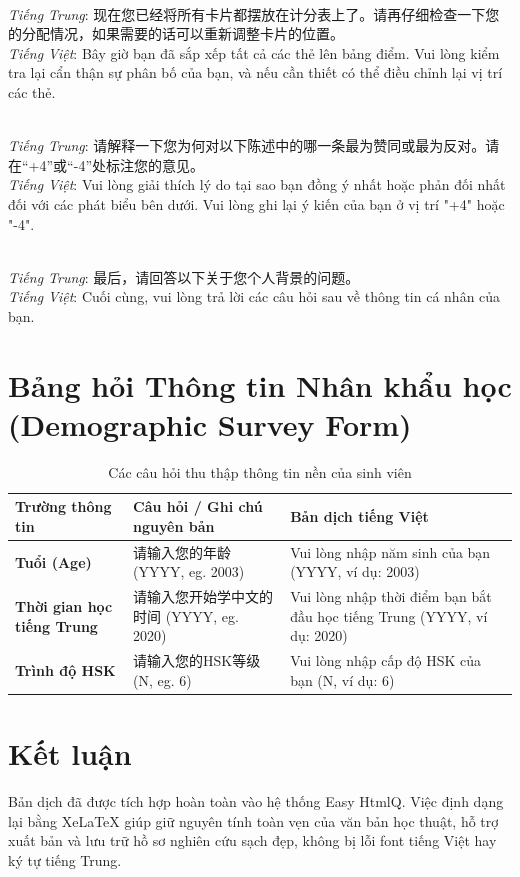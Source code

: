 \documentclass[11pt,a4paper]{article}
\begin{document}
\begin{description}[style=unboxed,leftmargin=0cm]
    \item[Bước 3 / 5 (Step 3 of 5: Review Sorting)] \hfill \\
    \textit{Tiếng Trung}: 现在您已经将所有卡片都摆放在计分表上了。请再仔细检查一下您的分配情况，如果需要的话可以重新调整卡片的位置。\\
    \textit{Tiếng Việt}: Bây giờ bạn đã sắp xếp tất cả các thẻ lên bảng điểm. Vui lòng kiểm tra lại cẩn thận sự phân bố của bạn, và nếu cần thiết có thể điều chỉnh lại vị trí các thẻ.

    \item[Bước 4 / 5 (Step 4 of 5: Comments)] \hfill \\
    \textit{Tiếng Trung}: 请解释一下您为何对以下陈述中的哪一条最为赞同或最为反对。请在“+4”或“-4”处标注您的意见。\\
    \textit{Tiếng Việt}: Vui lòng giải thích lý do tại sao bạn đồng ý nhất hoặc phản đối nhất đối với các phát biểu bên dưới. Vui lòng ghi lại ý kiến của bạn ở vị trí "+4" hoặc "-4".

    \item[Bước 5 / 5 (Step 5 of 5: Background Questions)] \hfill \\
    \textit{Tiếng Trung}: 最后，请回答以下关于您个人背景的问题。\\
    \textit{Tiếng Việt}: Cuối cùng, vui lòng trả lời các câu hỏi sau về thông tin cá nhân của bạn.
\end{description}

\section{Bảng hỏi Thông tin Nhân khẩu học (Demographic Survey Form)}

\begin{table}[h!]
\centering
\small
\begin{tabularx}{\textwidth}{>{\bfseries}l X X}
\toprule
Trường thông tin & Câu hỏi / Ghi chú nguyên bản & Bản dịch tiếng Việt \\
\midrule
Tuổi (Age) & 请输入您的年龄 (YYYY, eg. 2003) & Vui lòng nhập năm sinh của bạn (YYYY, ví dụ: 2003) \\
\addlinespace
Thời gian học tiếng Trung & 请输入您开始学中文的时间 (YYYY, eg. 2020) & Vui lòng nhập thời điểm bạn bắt đầu học tiếng Trung (YYYY, ví dụ: 2020) \\
\addlinespace
Trình độ HSK & 请输入您的HSK等级 (N, eg. 6) & Vui lòng nhập cấp độ HSK của bạn (N, ví dụ: 6) \\
\bottomrule
\end{tabularx}
\caption{Các câu hỏi thu thập thông tin nền của sinh viên}
\end{table}

\section{Kết luận}
Bản dịch đã được tích hợp hoàn toàn vào hệ thống Easy HtmlQ. Việc định dạng lại bằng XeLaTeX giúp giữ nguyên tính toàn vẹn của văn bản học thuật, hỗ trợ xuất bản và lưu trữ hồ sơ nghiên cứu sạch đẹp, không bị lỗi font tiếng Việt hay ký tự tiếng Trung.
\end{document}

